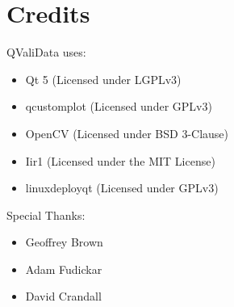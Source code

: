 \documentclass[]{article}
\begin{document}
	\section{Credits}
	QValiData uses:
		\begin{itemize}
			\item Qt 5 (Licensed under LGPLv3)
			\item qcustomplot (Licensed under GPLv3)
			\item OpenCV (Licensed under BSD 3-Clause)
			\item Iir1 (Licensed under the MIT License)
			\item linuxdeployqt (Licensed under GPLv3)
		\end{itemize}
	Special Thanks:
		\begin{itemize}
			\item Geoffrey Brown
			\item Adam Fudickar
			\item David Crandall
		\end{itemize}
\end{document}

